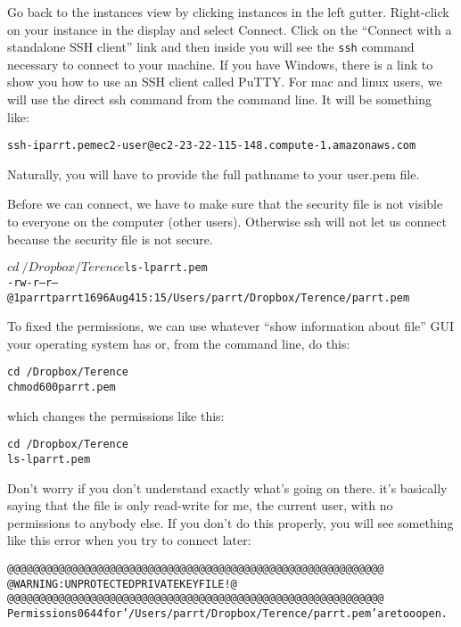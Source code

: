\begin{fullwidth}
\step Go back to the instances view by clicking instances in the left gutter. Right-click on your instance in the display and select Connect. Click on the ``Connect with a standalone SSH client'' link and then inside you will see the {\tt ssh} command necessary to connect to your machine. If you have Windows, there is a link to show you how to use an SSH client called PuTTY. For mac and linux users, we will use the direct ssh command from the command line. It will be something like:

{\small
\begin{alltt}
ssh -i parrt.pem ec2-user@ec2-23-22-115-148.compute-1.amazonaws.com
\end{alltt}
}

\noindent Naturally, you will have to provide the full pathname to your user.pem file.

\step  Before we can connect, we have to make sure that the security file is not visible to everyone on the computer (other users). Otherwise ssh will not let us connect because the security file is not secure.

{\small
\begin{alltt}$ cd ~/Dropbox/Terence
$ ls -l parrt.pem
-rw-r--r--@ 1 parrt  parrt  1696 Aug  4 15:15 /Users/parrt/Dropbox/Terence/parrt.pem
\end{alltt}
}


\noindent To fixed the permissions, we can use whatever ``show information about file'' GUI your operating system has or, from the command line, do this:

{\small
\begin{alltt}
cd ~/Dropbox/Terence
chmod 600 parrt.pem
\end{alltt}
}

\noindent which changes the permissions like this:

{\small
\begin{alltt}cd ~/Dropbox/Terence
ls -l parrt.pem
\end{alltt}
}

\noindent Don't worry if you don't understand exactly what's going on there. it's basically saying that the file is only read-write for me, the current user, with no permissions to anybody else. If you don't do this properly, you will see something like this error when you try to connect later:

{\small
\begin{alltt}@@@@@@@@@@@@@@@@@@@@@@@@@@@@@@@@@@@@@@@@@@@@@@@@@@@@@@@@@@@
@         WARNING: UNPROTECTED PRIVATE KEY FILE!          @
@@@@@@@@@@@@@@@@@@@@@@@@@@@@@@@@@@@@@@@@@@@@@@@@@@@@@@@@@@@
Permissions 0644 for '/Users/parrt/Dropbox/Terence/parrt.pem' are too open.
\end{alltt}
}


\end{fullwidth}
